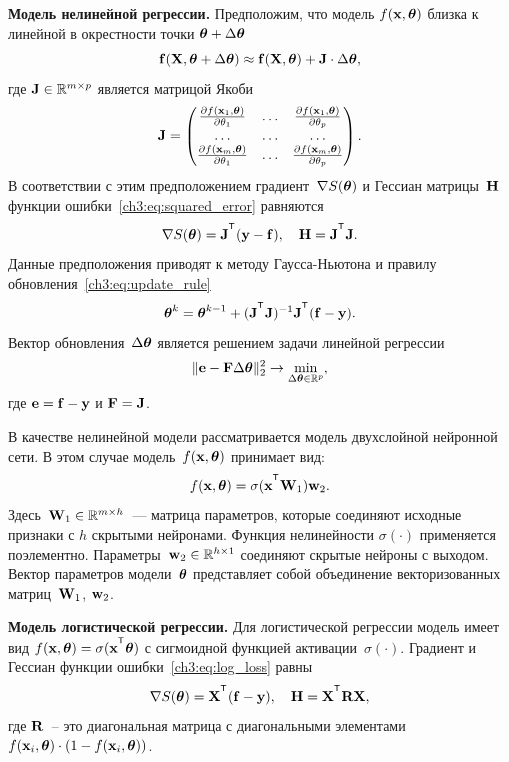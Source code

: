 \textbf{Модель нелинейной регрессии.}
Предположим, что модель $f (\mathbf{x} , \boldsymbol{\theta})$ близка к линейной в окрестности точки $\boldsymbol{\theta} + \Delta \boldsymbol{\theta}$
\[
\mathbf{f}(\mathbf{X} , \boldsymbol{\theta} + \Delta \boldsymbol{\theta}) \approx \mathbf{f}(\mathbf{X} , \boldsymbol{\theta}) + \mathbf{J} \cdot \Delta  \boldsymbol{\theta},
\]
где $\mathbf{J} \in \mathbb{R}^{m \times p}$ является матрицой Якоби
\begin{equation}
\mathbf{J} = 
\begin{pmatrix}
\frac{\partial f(\mathbf{x}_1 , \boldsymbol{\theta})}{\partial \theta_1} & \dots & 
\frac{\partial f(\mathbf{x}_1 , \boldsymbol{\theta})}{\partial \theta_p} \\
\dots & \dots & \dots \\
\frac{\partial f(\mathbf{x}_m , \boldsymbol{\theta})}{\partial \theta_1} & \dots & 
\frac{\partial f(\mathbf{x}_m , \boldsymbol{\theta})}{\partial \theta_p}
\end{pmatrix}.
\end{equation}
В соответствии с этим предположением градиент~$\nabla S(\boldsymbol{\theta})$ и Гессиан матрицы~$\mathbf{H}$ функции ошибки~\eqref{ch3:eq:squared_error} равняются
\begin{equation}
\nabla S(\btheta) = \bJ^{\T} (\by - \mathbf{f}), \quad \bH = \bJ^{\T} \bJ.
\label{ch3:eq:nonlin_reg_deriv}
\end{equation}
Данные предположения приводят к методу Гаусса-Ньютона и правилу обновления~\eqref{ch3:eq:update_rule}
\[
\btheta^k = \btheta^{k - 1} + (\bJ^{\T} \bJ)^{-1}\bJ^{\T}(\mathbf{f} - \by).
\]
Вектор обновления~$\Delta \boldsymbol{\theta}$ является решением задачи линейной регрессии
\begin{equation}
\| \mathbf{e} - \mathbf{F} \Delta \boldsymbol{\theta} \|_2^2 \rightarrow \min_{\Delta \boldsymbol{\theta} \in \mathbb{R}^{p}},
\label{ch3:eq:lin_reg_nonlin_reg}
\end{equation}
где $\mathbf{e} = \mathbf{f} - \mathbf{y}$ и $\mathbf{F} = \mathbf{J}$.

В качестве нелинейной модели рассматривается модель двухслойной нейронной сети. В этом случае модель~$f (\mathbf{x}, \boldsymbol{\theta})$ принимает вид:
\[
f(\bx, \btheta) = \sigma(\bx^{\T} \bW_1) \bw_2.
\]
Здесь~$\mathbf{W}_1 \in \mathbb{R}^{m \times h}$~--- матрица параметров, которые соединяют исходные признаки с $h$ скрытыми нейронами. Функция нелинейности $\sigma(\cdot)$ применяется поэлементно. Параметры~$\mathbf{w}_2 \in \mathbb{R}^{h \times 1}$ соединяют скрытые нейроны с выходом. 
Вектор параметров модели~$\boldsymbol{\theta}$ представляет собой объединение векторизованных матриц~$\mathbf{W}_1$, $\mathbf{w}_2$.

\textbf{Модель логистической регрессии.}
Для логистической регрессии модель имеет вид $f(\bx , \btheta) = \sigma(\bx^{\T} \btheta)$ с сигмоидной функцией активации~$\sigma(\cdot)$.
Градиент и Гессиан функции ошибки~\eqref{ch3:eq:log_loss} равны
\begin{equation}
\nabla S(\btheta) = \bX^{\T} (\mathbf{f} - \by), \quad \bH = \bX^{\T} \bR \bX,
\label{ch3:eq:log_reg_deriv}
\end{equation}
где $\mathbf{R}$~-- это диагональная матрица с диагональными элементами $f(\mathbf{x}_i , \boldsymbol{\theta}) \cdot (1 - f(\mathbf{x}_i , \boldsymbol{\theta}))$.

